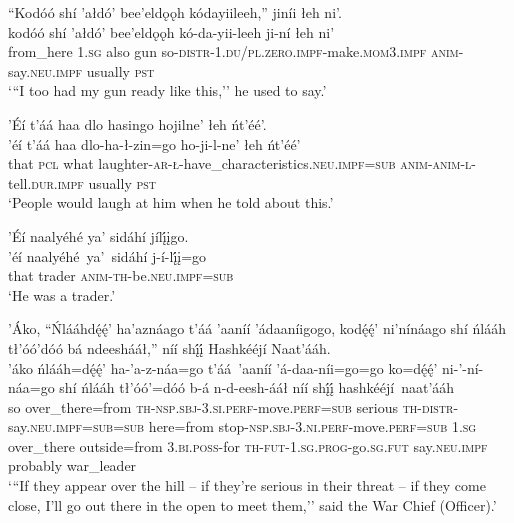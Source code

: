 \newpage
\ea\label{ex:text1-62-2}
``Kodóó shí ’ałdó’ bee’eldǫǫh kódayiileeh,'' jiníi łeh ni’.\\
\gll kodóó	shí	’ałdó’	bee’eldǫǫh	kó-da-yii-leeh	ji-ní	łeh	ni’\\
     from\_here	1.\textsc{sg}	also	gun	so-\textsc{distr}-1.\textsc{du}/\textsc{pl}.\textsc{zero}.\textsc{impf}-make.\textsc{mom}3.\textsc{impf}	\textsc{anim}-say.\textsc{neu}.\textsc{impf}	usually	\textsc{pst}\\
\glt `{``}I too had my gun ready like this,'' he used to say.'
\z

\ea\label{ex:text1-63-1}
’Éí t’áá haa dlo hasingo hojilne’ łeh ńt’éé’.\\
\gll ’éí	t’áá	haa	dlo-ha-ł-zin=go	ho-ji-l-ne’	łeh	ńt’éé’\\
     that	\textsc{pcl}	what	laughter-\textsc{ar}-\textsc{ł}-have\_characteristics.\textsc{neu}.\textsc{impf}=\textsc{sub}	\textsc{anim}-\textsc{anim}-\textsc{l}-tell.\textsc{dur}.\textsc{impf}	usually	\textsc{pst}\\
\glt `People would laugh at him when he told about this.'
\z

\ea\label{ex:text1-63-2}
’Éí naalyéhé ya’ sidáhí jílį́įgo.\\
\gll ’éí	naalyéhé~ya’~{sidáhí}	j-í-lį́į=go\\
     that	trader	\textsc{anim}-\textsc{th}-be.\textsc{neu}.\textsc{impf}=\textsc{sub}\\
\glt `He was a trader.'
\z

\ea\label{ex:text1-64-1}
’Áko, ``Ńlááhdę́ę́’ ha’aznáago t’áá ’aaníí ’ádaaníigogo, kodę́ę́’ ni’nínáago shí ńlááh tł’óó’dóó bá ndeeshááł,'' níí shį́į́ Hashkééjí Naat’ááh.\\
\gll ’áko	ńlááh=dę́ę́’	ha-’a-z-náa=go	t’áá~{’aaníí}	’á-daa-níi=go=go	ko=dę́ę́’	ni-’-ní-náa=go	shí	ńlááh	tł’óó’=dóó	b-á	n-d-eesh-ááł	níí	shį́į́	hashkééjí~{naat’ááh}\\
     so	over\_there=from	\textsc{th}-\textsc{nsp}.\textsc{sbj}-3.\textsc{si}.\textsc{perf}-move.\textsc{perf}=\textsc{sub}	serious	\textsc{th}-\textsc{distr}-say.\textsc{neu}.\textsc{impf}=\textsc{sub}=\textsc{sub}	here=from	stop-\textsc{nsp}.\textsc{sbj}-3.\textsc{ni}.\textsc{perf}-move.\textsc{perf}=\textsc{sub}	1.\textsc{sg}	over\_there	outside=from	3.\textsc{bi}.\textsc{poss}-for	\textsc{th}-\textsc{fut}-1.\textsc{sg}.\textsc{prog}-go.\textsc{sg}.\textsc{fut}	say.\textsc{neu}.\textsc{impf}	probably	war\_leader\\
\glt `{``}If they appear over the hill -- if they're serious in their threat -- if they come close, I'll go out there in the open to meet them,'' said the War Chief (Officer).'
\z

